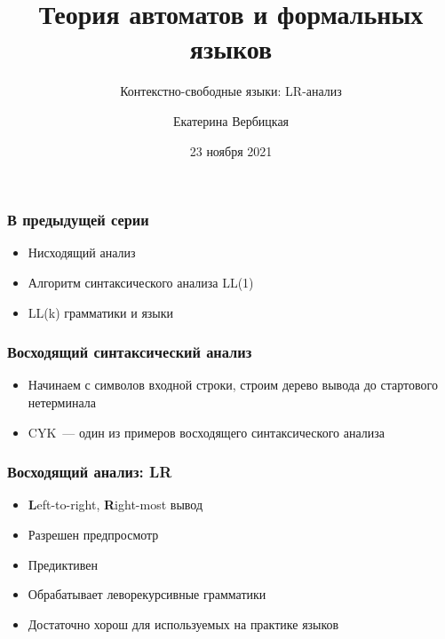 \documentclass{beamer}
\title[]{Теория автоматов и формальных языков}
\subtitle[]{Контекстно-свободные языки: LR-анализ}
\institute[]{
Санкт-Петербургский государственный электротехнический университет <<ЛЭТИ>>\\
}
\author[]{Екатерина Вербицкая}
\date{23 ноября 2021}
\begin{document}
{
  \begin{frame}
    \titlepage
  \end{frame}
}


\begin{frame}[fragile]
  \transwipe[direction=90]
  \frametitle{В предыдущей серии}
  \begin{itemize}
    \item Нисходящий анализ
    \item Алгоритм синтаксического анализа LL(1)
    \item LL(k) грамматики и языки
  \end{itemize}
\end{frame}

\begin{frame}[fragile]
  \transwipe[direction=90]
  \frametitle{Восходящий синтаксический анализ}
  \begin{itemize}
    \item Начинаем с символов входной строки, строим дерево вывода до стартового нетерминала
    \item CYK~--- один из примеров восходящего синтаксического анализа
  \end{itemize}

\end{frame}

\begin{frame}[fragile]
  \transwipe[direction=90]
  \frametitle{Восходящий анализ: LR}
  \begin{itemize}
    \item \textbf{L}eft-to-right, \textbf{R}ight-most вывод
    \item Разрешен предпросмотр
    \item Предиктивен
    \item Обрабатывает леворекурсивные грамматики
    \item Достаточно хорош для используемых на практике языков
  \end{itemize}
\end{frame}
\end{document}
